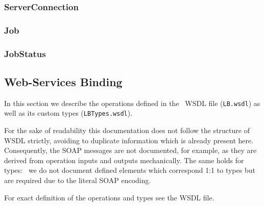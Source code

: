 \subsubsection{ServerConnection}
\subsubsection{Job}
\subsubsection{JobStatus}


\subsection{Web-Services Binding}\label{s:Consumer-API-WS}


In this section we describe the operations defined in the \LB\ WSDL
file (\texttt{LB.wsdl}) as well as its custom types (\texttt{LBTypes.wsdl}).

For the sake of readability this documentation does not follow the structure
of WSDL strictly, avoiding to duplicate information which is already present
here. Consequently, the SOAP messages are not documented, for example, as they
are derived from operation inputs and outputs mechanically.
The same holds for types: \eg\ we do not document defined elements
which correspond 1:1 to types but are required due to the literal SOAP
encoding.

For exact definition of the operations and types see the WSDL file.


